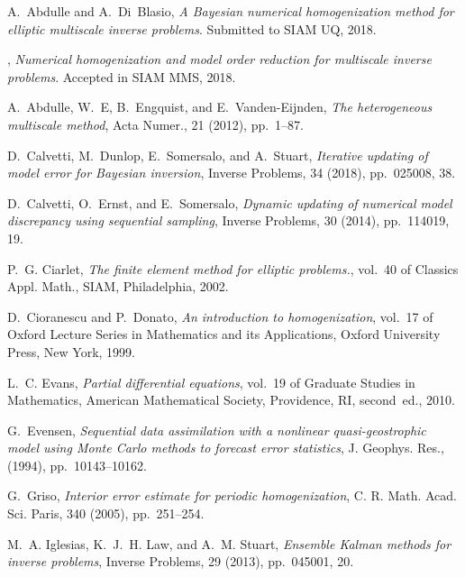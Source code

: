 \documentclass[10pt]{article}
\begin{document}
\clearpage



\def\cprime{$'$}
\begin{thebibliography}{10}
	
	{\sc A.~Abdulle and A.~Di~Blasio}, {\em A {B}ayesian numerical homogenization
		method for elliptic multiscale inverse problems}.
	\newblock Submitted to SIAM UQ, 2018.
	
	\leavevmode\vrule height 2pt depth -1.6pt width 23pt, {\em Numerical
		homogenization and model order reduction for multiscale inverse problems}.
	\newblock Accepted in SIAM MMS, 2018.
	
	{\sc A.~Abdulle, W.~E, B.~Engquist, and E.~Vanden-Eijnden}, {\em The
		heterogeneous multiscale method}, Acta Numer., 21 (2012), pp.~1--87.
	
	{\sc D.~Calvetti, M.~Dunlop, E.~Somersalo, and A.~Stuart}, {\em Iterative
		updating of model error for {B}ayesian inversion}, Inverse Problems, 34
	(2018), pp.~025008, 38.
	
	{\sc D.~Calvetti, O.~Ernst, and E.~Somersalo}, {\em Dynamic updating of
		numerical model discrepancy using sequential sampling}, Inverse Problems, 30
	(2014), pp.~114019, 19.
	
	{\sc P.~G. Ciarlet}, {\em The finite element method for elliptic problems.},
	vol.~40 of Classics Appl. Math., SIAM, Philadelphia, 2002.
	
	{\sc D.~Cioranescu and P.~Donato}, {\em An introduction to homogenization},
	vol.~17 of Oxford Lecture Series in Mathematics and its Applications, Oxford
	University Press, New York, 1999.
	
	{\sc L.~C. Evans}, {\em Partial differential equations}, vol.~19 of Graduate
	Studies in Mathematics, American Mathematical Society, Providence, RI,
	second~ed., 2010.
	
	{\sc G.~Evensen}, {\em Sequential data assimilation with a nonlinear
		quasi-geostrophic model using {M}onte {C}arlo methods to forecast error
		statistics}, J. Geophys. Res.,  (1994), pp.~10143--10162.
	
	{\sc G.~Griso}, {\em Interior error estimate for periodic homogenization}, C.
	R. Math. Acad. Sci. Paris, 340 (2005), pp.~251--254.
	
	{\sc M.~A. Iglesias, K.~J.~H. Law, and A.~M. Stuart}, {\em Ensemble {K}alman
		methods for inverse problems}, Inverse Problems, 29 (2013), pp.~045001, 20.
	

\end{thebibliography}
\end{document}
